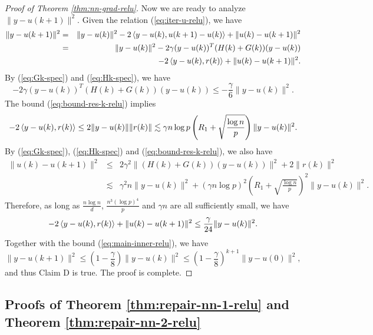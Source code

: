 \begin{proof}[Proof of Theorem \ref{thm:nn-grad-relu}]
Now we are ready to analyze $\|y-u(k+1)\|^2$. Given the relation (\ref{eq:iter-u-relu}), we have
\begin{eqnarray*}
\|y-u(k+1)\|^2 &=& \|y-u(k)\|^2 - 2\iprod{y-u(k)}{u(k+1)-u(k)} + \|u(k)-u(k+1)\|^2 \\
&=& \|y-u(k)\|^2 - 2\gamma(y-u(k))^T(H(k)+G(k))(y-u(k)) \\
&& - 2\iprod{y-u(k)}{r(k)} + \|u(k)-u(k+1)\|^2.
\end{eqnarray*}
By (\ref{eq:Gk-spec}) and (\ref{eq:Hk-spec}), we have
\begin{equation}
- 2\gamma(y-u(k))^T(H(k)+G(k))(y-u(k)) \leq -\frac{\gamma}{6}\|y-u(k)\|^2. \label{eq:main-inner-relu}
\end{equation}
The bound (\ref{eq:bound-res-k-relu}) implies
$$- 2\left \langle y-u(k), r(k) \right\rangle\leq 2\|y-u(k)\|\|r(k)\|\lesssim \gamma n\log p\left(R_1+\sqrt{\frac{\log n}{p}}\right)\|y-u(k)\|^2.$$
By (\ref{eq:Gk-spec}), (\ref{eq:Hk-spec}) and (\ref{eq:bound-res-k-relu}), we also have
\begin{eqnarray*}
\|u(k)-u(k+1)\|^2 &\leq& 2\gamma^2\|(H(k)+G(k))(y-u(k))\|^2 + 2\|r(k)\|^2 \\
&\lesssim& \gamma^2n\|y-u(k)\|^2 + (\gamma n\log p)^2\left(R_1+\sqrt{\frac{\log n}{p}}\right)^2\|y-u(k)\|^2 .
\end{eqnarray*}
Therefore, as long as $\frac{n\log n}{d}$, $\frac{n^3(\log p)^4}{p}$ and $\gamma n$ are all sufficiently small, we have
$$- 2\left \langle y-u(k), r(k) \right\rangle + \|u(k)-u(k+1)\|^2 \leq \frac{\gamma}{24}\|y-u(k)\|^2.$$
Together with the bound (\ref{eq:main-inner-relu}), we have
$$\|y-u(k+1)\|^2 \leq \left(1-\frac{\gamma}{8}\right)\|y-u(k)\|^2\leq \left(1-\frac{\gamma}{8}\right)^{k+1}\|y-u(0)\|^2,$$
and thus Claim D is true. The proof is complete.
\end{proof}


\subsection{Proofs of Theorem \ref{thm:repair-nn-1-relu} and Theorem \ref{thm:repair-nn-2-relu}}

